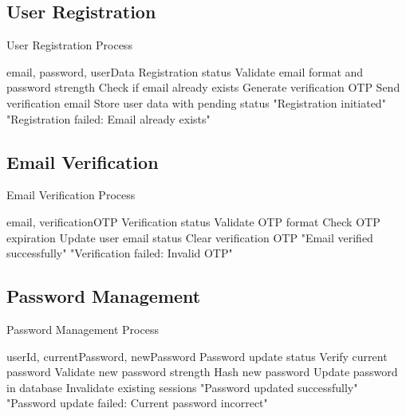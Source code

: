\subsection{User Registration}
\begin{algorithm}[H]
\caption{User Registration Process}\label{alg:registration}
\begin{algorithmic}[1]
\Require email, password, userData
\Ensure Registration status
\State Validate email format and password strength
\State Check if email already exists
    \State Generate verification OTP
    \State Send verification email
    \State Store user data with pending status
    \State \Return "Registration initiated"
\Else
    \State \Return "Registration failed: Email already exists"
\EndIf
\end{algorithmic}
\end{algorithm}

\subsection{Email Verification}
\begin{algorithm}[H]
\caption{Email Verification Process}\label{alg:email_verification}
\begin{algorithmic}[1]
\Require email, verificationOTP
\Ensure Verification status
\State Validate OTP format
\State Check OTP expiration
    \State Update user email status
    \State Clear verification OTP
    \State \Return "Email verified successfully"
\Else
    \State \Return "Verification failed: Invalid OTP"
\EndIf
\end{algorithmic}
\end{algorithm}

\subsection{Password Management}
\begin{algorithm}[H]
\caption{Password Management Process}\label{alg:password}
\begin{algorithmic}[1]
\Require userId, currentPassword, newPassword
\Ensure Password update status
\State Verify current password
    \State Validate new password strength
    \State Hash new password
    \State Update password in database
    \State Invalidate existing sessions
    \State \Return "Password updated successfully"
\Else
    \State \Return "Password update failed: Current password incorrect"
\EndIf
\end{algorithmic}
\end{algorithm}

